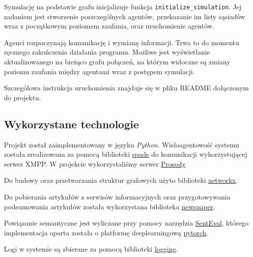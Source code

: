 \documentclass{article}
\begin{document}
	Symulację na podstawie grafu inicjalizuje funkcja {\tt initialize\_simulation}. Jej zadaniem jest stworzenie poszczególnych agentów, przekazanie im listy sąsiadów wraz z początkowym poziomem zaufania, oraz uruchomienie agentów.
	
	Agenci rozpoczynają komunikację i wymianę informacji. Trwa to do momentu ręcznego zakończenia działania programu. Możliwe jest wyświetlanie aktualizowanego na bieżąco grafu połączeń, na którym widoczne są zmiany poziomu zaufania między agentami wraz z postępem symulacji.
	
	Szczegółowa instrukcja uruchomienia znajduje się w pliku README dołączonym do projektu.

	\subsection{Wykorzystane technologie}
	Projekt został zaimplementowany w języku \textit{Python}. Wieloagentowość systemu została zrealizowana za pomocą biblioteki \href{https://pypi.org/project/spade/}{spade} do komunikacji wykorzystującej serwer XMPP. W projekcie wykorzystaliśmy serwer \href{https://prosody.im/}{Prosody} 
	
	Do budowy oraz przetwarzania struktur grafowych użyto biblioteki \href{https://networkx.github.io/}{networkx}.
	
	Do pobierania artykułów z serwisów informacyjnych oraz przygotowywania podsumowania artykułów została wykorzystana biblioteka  \href{https://newspaper.readthedocs.io/}{newspaper}.
	
	Powiązanie semantyczne jest wyliczane przy pomocy narzędzia \href{http://nlpprogress.com/english/semantic_textual_similarity.html}{SentEval}, którego implementacja oparta została o platformę deeplearningową \href{https://pytorch.org/}{pytorch}.
	
	Logi w systemie są zbierane za pomocą biblioteki \href{https://docs.python.org/3/library/logging.html#module-logging}{logging}.
	
\end{document}
